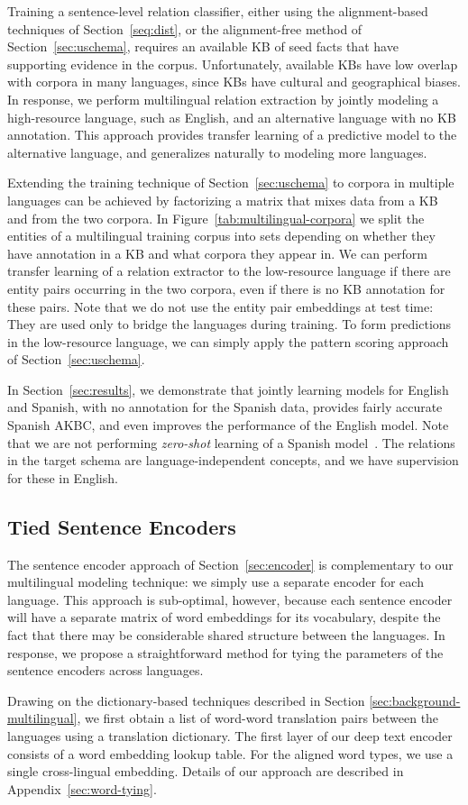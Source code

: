 Training a sentence-level relation classifier, either using the alignment-based techniques of Section~\ref{seq:dist}, or the alignment-free method of Section~\ref{sec:uschema}, requires an available KB of seed facts that have supporting evidence in the corpus.  Unfortunately, available KBs have low overlap with corpora in many languages, since KBs have cultural and geographical biases. In response, we perform multilingual relation extraction by jointly modeling a high-resource language, such as English, and an alternative language with no KB annotation. This approach provides transfer learning of a predictive model to the alternative language, and generalizes naturally to modeling more languages.


Extending the training technique of Section~\ref{sec:uschema} to corpora in multiple languages can be achieved by factorizing a matrix that mixes data from a KB and from the two corpora. In Figure~\ref{tab:multilingual-corpora} we split the entities of a multilingual training corpus into sets depending on whether they have annotation in a KB and what corpora they appear in. We can perform transfer learning of a relation extractor to the low-resource language if there are entity pairs occurring in the two corpora, even if there is no KB annotation for these pairs. Note that we do not use the entity pair embeddings at test time: They are used only to bridge the languages during training. To form predictions in the low-resource language, we can simply apply the pattern scoring approach of Section~\ref{sec:uschema}.

In Section~\ref{sec:results}, we demonstrate that jointly learning models for English and Spanish, with no annotation for the Spanish data, provides fairly accurate Spanish AKBC, and even improves the performance of the English model. Note that we are not performing \textit{zero-shot} learning of a Spanish model~\citep{zeroshot}. The relations in the target schema are language-independent concepts, and we have supervision for these in English.



\subsection{Tied Sentence Encoders \label{sec:tie-words}}
The sentence encoder approach of Section~\ref{sec:encoder} is complementary to our multilingual modeling technique: we simply use a separate encoder for each language.  This approach is sub-optimal, however, because each sentence encoder will have a separate matrix of word embeddings for its vocabulary, despite the fact that there may be considerable shared structure between the languages. In response, we propose a straightforward method for tying the parameters of the sentence encoders across languages.

Drawing on the dictionary-based techniques described in Section \ref{sec:background-multilingual}, we first obtain a list of word-word translation pairs between the languages using a translation dictionary. The first layer of our deep text encoder consists of a word embedding lookup table. For the aligned word types, we use a single cross-lingual embedding.
Details of our approach are described in Appendix~\ref{sec:word-tying}.


